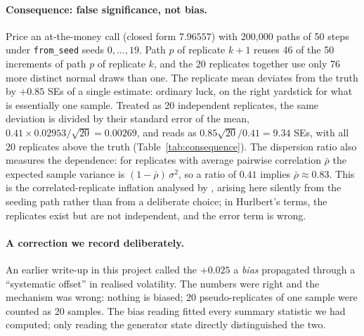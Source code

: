 \documentclass{article}
\newcommand{\fromseed}{\texttt{from\_seed}}
\begin{document}
\paragraph{Consequence: false significance, not bias.} Price an at-the-money call (closed form
$7.96557$) with 200{,}000 paths of 50 steps under \fromseed{} seeds $0, \dots, 19$. Path $p$ of
replicate $k+1$ reuses 46 of the 50 increments of path $p$ of replicate $k$, and the 20 replicates
together use only 76 more distinct normal draws than one. The replicate mean deviates from the
truth by $+0.85$ SEs of a single estimate: ordinary luck, on the right yardstick for what is
essentially one sample. Treated as 20 independent replicates, the same deviation is divided by
their standard error of the mean, $0.41 \times 0.02953/\sqrt{20} = 0.00269$, and reads as
$0.85\sqrt{20}/0.41 = 9.34$ SEs, with all 20 replicates above the truth
(Table~\ref{tab:consequence}). The dispersion ratio also measures the dependence: for replicates
with average pairwise correlation $\bar\rho$ the expected sample variance is
$(1 - \bar\rho)\,\sigma^2$, so a ratio of $0.41$ implies $\bar\rho \approx 0.83$. This is the
correlated-replicate inflation analysed by \citet[Eq.~7]{bouthillier2021accounting}, arising here
silently from the seeding path rather than from a deliberate choice; in Hurlbert's terms, the
replicates exist but are not independent, and the error term is wrong.

\paragraph{A correction we record deliberately.} An earlier write-up in this project called the
$+0.025$ a \emph{bias} propagated through a ``systematic offset'' in realised volatility. The
numbers were right and the mechanism was wrong: nothing is biased; 20 pseudo-replicates of one
sample were counted as 20 samples. The bias reading fitted every summary statistic we had
computed; only reading the generator state directly distinguished the two.
\end{document}

